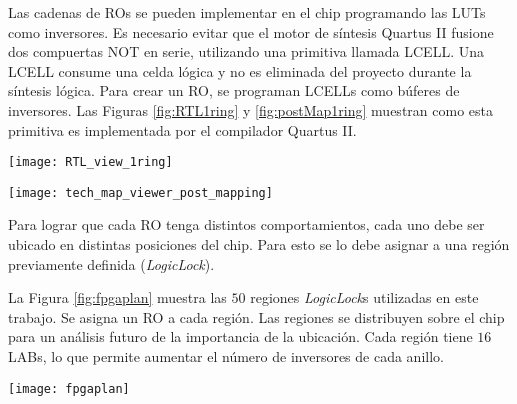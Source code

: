 Las cadenas de {RO}s se pueden implementar en el chip programando las {LUT}s como inversores.
Es necesario evitar que el motor de síntesis {Quartus} II fusione dos compuertas {NOT} en serie, utilizando una primitiva llamada {LCELL}.
Una {LCELL} consume una celda lógica y no es eliminada del proyecto durante la síntesis lógica.
Para crear un {RO}, se programan {LCELL}s como búferes de inversores.
Las Figuras \ref{fig:RTL1ring} y \ref{fig:postMap1ring} muestran como esta primitiva es implementada por el compilador Quartus II.
%
\begin{figure*}
\begin{center}
\texttt{[image: RTL\_view\_1ring]}
\caption{Vista RTL de un ring con $3$ inversores.}
\label{fig:RTL1ring}
\end{center}
\end{figure*}
%
\begin{figure*}
\begin{center}
\texttt{[image: tech\_map\_viewer\_post\_mapping]}
\caption{\textit{Technology map viewer} (post mapeo) de un ring con $3$ inversores.} \label{fig:postMap1ring}
\end{center}
\end{figure*}

Para lograr que cada {RO} tenga distintos comportamientos, cada uno debe ser ubicado en distintas posiciones del chip.
Para esto se lo debe asignar a una región previamente definida (\textit{LogicLock}).

La Figura \ref{fig:fpgaplan} muestra las $50$ regiones \emph{LogicLock}s utilizadas en este trabajo.
Se asigna un {RO} a cada región.
Las regiones se distribuyen sobre el chip para un análisis futuro de la importancia de la ubicación.
Cada región tiene $16$ {LAB}s, lo que permite aumentar el número de inversores de cada anillo.
%
\begin{figure*}
\begin{center}
\texttt{[image: fpgaplan]}
\caption{Vista de las regiones \emph{LogicLock} del \emph{Chip Planner}.}
\label{fig:fpgaplan}
\end{center}
\end{figure*}

